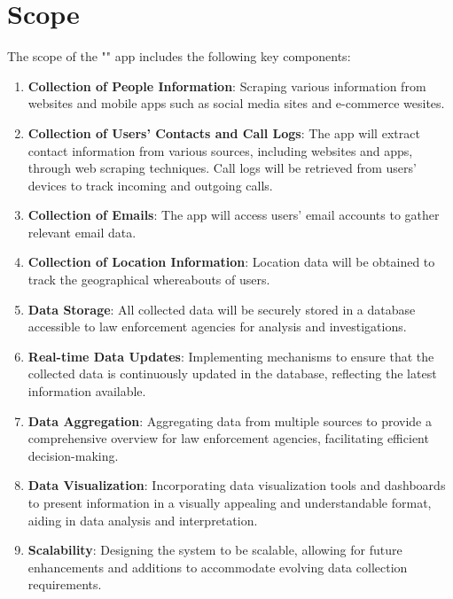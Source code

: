 \section{Scope}
The scope of the "{\myprojectname}" app includes the following key components:
\begin{enumerate}[label=\arabic*.]
    \item \textbf{Collection of People Information}: Scraping various information from websites and mobile apps such as social media sites and e-commerce wesites.
    \item \textbf{Collection of Users' Contacts and Call Logs}: The app will extract contact information from various sources, including websites and apps, through web scraping techniques. Call logs will be retrieved from users' devices to track incoming and outgoing calls.
    \item \textbf{Collection of Emails}: The app will access users' email accounts to gather relevant email data.
    \item \textbf{Collection of Location Information}: Location data will be obtained to track the geographical whereabouts of users.
    \item \textbf{Data Storage}: All collected data will be securely stored in a database accessible to law enforcement agencies for analysis and investigations.
    \item \textbf{Real-time Data Updates}: Implementing mechanisms to ensure that the collected data is continuously updated in the database, reflecting the latest information available.
    \item \textbf{Data Aggregation}: Aggregating data from multiple sources to provide a comprehensive overview for law enforcement agencies, facilitating efficient decision-making.
    \item \textbf{Data Visualization}: Incorporating data visualization tools and dashboards to present information in a visually appealing and understandable format, aiding in data analysis and interpretation.
    \item \textbf{Scalability}: Designing the system to be scalable, allowing for future enhancements and additions to accommodate evolving data collection requirements.
\end{enumerate}

